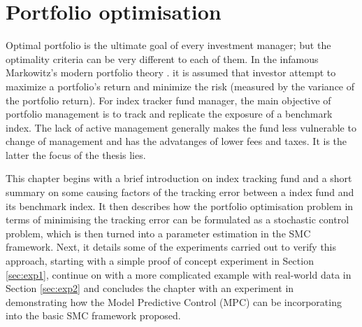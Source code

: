 \chapter{Portfolio optimisation}
\graphicspath{{Chapter4/figures/}}
\label{lab:PO}
Optimal portfolio is the ultimate goal of every investment manager; but the optimality criteria can be very different to each of them. In the infamous Markowitz's modern portfolio theory \cite{HM52}. it is assumed that investor attempt to maximize a portfolio's return and minimize the risk (measured by the variance of the portfolio return). For index tracker fund manager, the main objective of portfolio management is to track and replicate the exposure of a benchmark index. The lack of active management generally makes the fund less vulnerable to change of management and has the advatanges of lower fees and taxes. It is the latter the focus of the thesis lies.
 
This chapter begins with a brief introduction on index tracking fund and a short summary on some causing factors of the tracking error between a index fund and its benchmark index. It then describes how the portfolio optimisation problem in terms of minimising the tracking error can be formulated as a stochastic control problem, which is then turned into a parameter estimation in the SMC framework. Next, it details some of the experiments carried out to verify this approach, starting with a simple proof of concept experiment in Section \ref{sec:exp1}, continue on with a more complicated example with real-world data in Section \ref{sec:exp2} and concludes the chapter with an experiment in demonstrating how the Model Predictive Control (MPC) can be incorporating into the basic SMC framework proposed.
 
 
